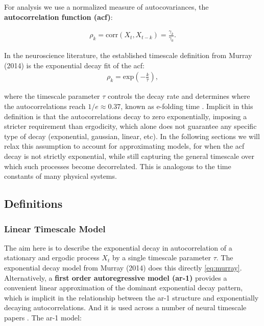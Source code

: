 \documentclass[main.tex]{subfiles}
\begin{document}
For analysis we use a normalized measure of autocovariances, the \textbf{autocorrelation function (acf)}:

\begin{align} \label{eq:acf}
\rho_k = \text{corr}(X_t, X_{t-k}) = \frac{\gamma_k}{\gamma_0}.
\end{align}

In the neuroscience literature, the established timescale definition from Murray (2014) is the exponential decay fit of the acf:
\begin{align} \label{eq:murray}
    \rho_k = \text{exp}(-\frac{k}{\tau}),
\end{align}

where the timescale parameter $\tau$ controls the decay rate and determines where the autocorrelations reach $1/e \approx 0.37$, known as e-folding time \cite{murray_hierarchy_2014}. Implicit in this definition is that the autocorrelations decay to zero exponentially, imposing a stricter requirement than ergodicity, which alone does not guarantee any specific type of decay (exponential, gaussian, linear, etc). In the following sections we will relax this assumption to account for approximating models, for when the acf decay is not strictly exponential, while still capturing the general timescale over which such processes become decorrelated. This is analogous to the time constants of many physical systems.\\


\subsection{Definitions}
\subsubsection{Linear Timescale Model}\label{sec:linear-timescale-model}
The aim here is to describe the exponential decay in autocorrelation of a stationary and ergodic process $X_t$ by a single timescale parameter $\tau$. The exponential decay model from Murray (2014) does this directly \ref{eq:murray}. Alternatively, a \textbf{first order autoregressive model (ar-1)} provides a convenient linear approximation of the dominant exponential decay pattern, which is implicit in the relationship between the ar-1 structure and exponentially decaying autocorrelations. And it is used across a number of neural timescale papers \cite{kaneoke_variance_2012, meisel_decline_2017, huang_timescales_2018, lurie_cortical_2024, shinn_functional_2023, shafiei_topographic_2020}. The ar-1 model:
\end{document}
